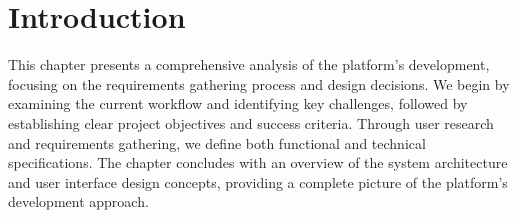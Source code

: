 \section{Introduction}
\noindent

This chapter presents a comprehensive analysis of the platform's development, focusing on the requirements gathering process and design decisions. We begin by examining the current workflow and identifying key challenges, followed by establishing clear project objectives and success criteria. Through user research and requirements gathering, we define both functional and technical specifications. The chapter concludes with an overview of the system architecture and user interface design concepts, providing a complete picture of the platform's development approach.
